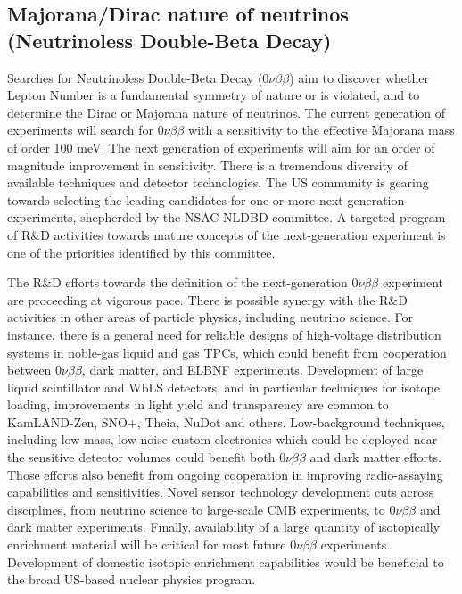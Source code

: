 \subsection{Majorana/Dirac nature of neutrinos (Neutrinoless
  Double-Beta Decay)}

Searches for Neutrinoless Double-Beta Decay
($0\nu\beta\beta$) aim to discover whether Lepton Number is a
fundamental symmetry of nature or is violated, and to determine the Dirac or
Majorana nature of neutrinos. The current generation of experiments
will search for $0\nu\beta\beta$  with a sensitivity to the effective Majorana
mass of order 100 meV. The next generation of experiments will aim for
an order of magnitude improvement in sensitivity. There is a
tremendous diversity of available techniques and detector
technologies. The US community is gearing towards selecting the
leading candidates for one or more next-generation experiments,
shepherded by the NSAC-NLDBD committee. A targeted program of R\&D
activities towards mature concepts of the next-generation experiment
is one of the priorities identified by this committee. 

The R\&D efforts towards the definition of the next-generation
$0\nu\beta\beta$ experiment are proceeding at vigorous pace. There is
possible synergy with the R\&D activities in other areas of particle
physics, including neutrino science. For instance, there is a general
need for reliable designs of high-voltage distribution systems in
noble-gas liquid and gas TPCs, which could benefit from cooperation
between $0\nu\beta\beta$, dark matter, and ELBNF
experiments. Development of large liquid scintillator and WbLS
detectors, and in particular techniques for isotope loading,
improvements in light yield and transparency are common to
KamLAND-Zen, SNO+, Theia, NuDot and others. Low-background techniques,
including low-mass, low-noise custom electronics which could be
deployed near the sensitive detector volumes could benefit both
$0\nu\beta\beta$ and dark matter efforts. Those efforts also benefit
from ongoing cooperation in improving radio-assaying capabilities and
sensitivities. Novel sensor technology development cuts across
disciplines, from neutrino science to large-scale CMB experiments, to
$0\nu\beta\beta$ and dark matter experiments. Finally, availability of
a large quantity of isotopically enrichment material will be critical
for most future $0\nu\beta\beta$ experiments. Development of 
domestic isotopic enrichment capabilities would be beneficial to the
broad US-based nuclear physics program.
